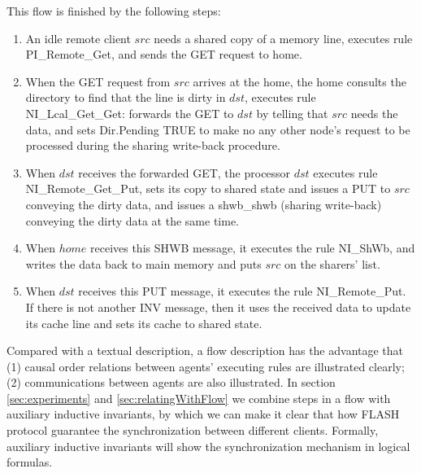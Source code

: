 \documentclass{llncs}
\begin{document}
This flow is finished by the following steps:
\begin{enumerate}
\item An idle remote  client $src$ needs a shared copy of a memory line, executes   rule PI\_Remote\_Get, and  sends the GET request to home.

\item  When the GET request from $src$ arrives at the
home, the home consults the directory to find that the line is dirty in $dst$,  executes rule NI\_Lcal\_Get\_Get: forwards the GET to $dst$ by telling that $src$ needs the data, and sets Dir.Pending TRUE to make no any other node's request to be processed during the sharing write-back procedure.

\item  When $dst$ receives the forwarded GET, the
processor $dst$ executes rule \\
NI\_Remote\_Get\_Put, sets its copy to shared state and issues a PUT to $src$ conveying the dirty data,  and  issues a   shwb\_shwb
 (sharing write-back) conveying the dirty data at the same time.

\item   When $home$ receives this SHWB message, it executes the rule NI\_ShWb, and
 writes the
data back  to main memory and puts $src$ on the sharers' list.

\item When $dst$ receives this PUT message, it executes the rule NI\_Remote\_Put. If there is not another INV message, then it   uses the received data to update its cache line and sets its cache to shared state.


\end{enumerate}

Compared with a textual description, a flow description has the advantage that (1) causal order relations between agents' executing rules are illustrated clearly; (2) communications between agents are also illustrated. In section \ref{sec:experiments} and \ref{sec:relatingWithFlow} we combine steps in a flow with auxiliary inductive invariants, by which we can make it clear that how  FLASH protocol guarantee the synchronization between different clients. Formally, auxiliary inductive invariants will show    the synchronization mechanism in logical formulas.

\end{document}
